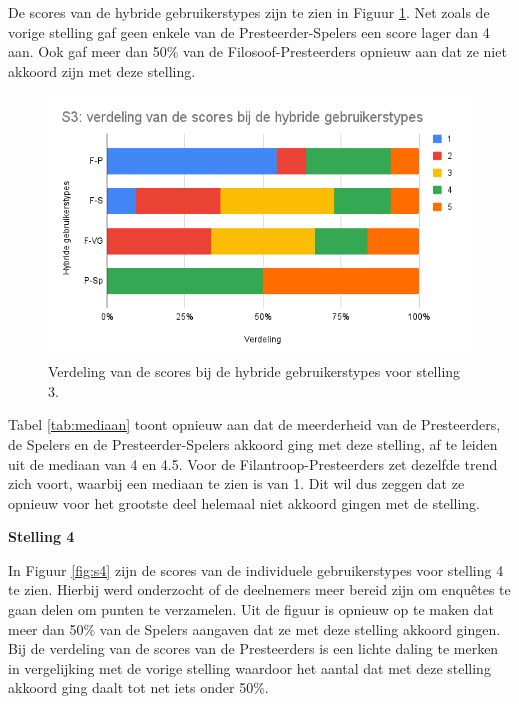 De scores van de hybride gebruikerstypes zijn te zien in Figuur \ref{fig:s3_hybride}. Net zoals de vorige stelling gaf geen enkele van de Presteerder-Spelers een score lager dan 4 aan. Ook gaf meer dan 50\% van de Filosoof-Presteerders opnieuw aan dat ze niet akkoord zijn met deze stelling.

\begin{figure}
    \includegraphics[width=\linewidth]{S3_Hybride.png}
    \caption{Verdeling van de scores bij de hybride gebruikerstypes voor stelling 3.}
    \label{fig:s3_hybride}
\end{figure}

Tabel \ref{tab:mediaan} toont opnieuw aan dat de meerderheid van de Presteerders, de Spelers en de Presteerder-Spelers akkoord ging met deze stelling, af te leiden uit de mediaan van 4 en 4.5. Voor de Filantroop-Presteerders zet dezelfde trend zich voort, waarbij een mediaan te zien is van 1. Dit wil dus zeggen dat ze opnieuw voor het grootste deel helemaal niet akkoord gingen met de stelling.

\textbf{Stelling 4}

In Figuur \ref{fig:s4} zijn de scores van de individuele gebruikerstypes voor stelling 4 te zien. Hierbij werd onderzocht of de deelnemers meer bereid zijn om enquêtes te gaan delen om punten te verzamelen. Uit de figuur is opnieuw op te maken dat meer dan 50\% van de Spelers aangaven dat ze met deze stelling akkoord gingen. Bij de verdeling van de scores van de Presteerders is een lichte daling te merken in vergelijking met de vorige stelling waardoor het aantal dat met deze stelling akkoord ging daalt tot net iets onder 50\%.

